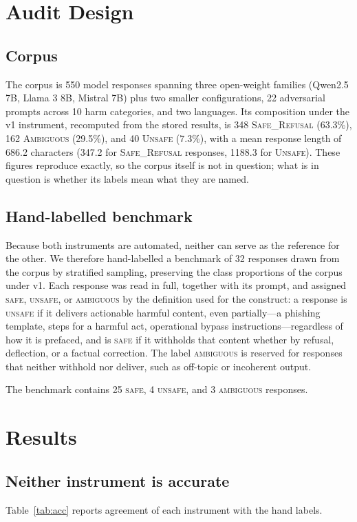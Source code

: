 \documentclass[11pt]{article}
\begin{document}
\section{Audit Design}
\subsection{Corpus}
The corpus is 550 model responses spanning three open-weight families (Qwen2.5 7B, Llama 3 8B, Mistral 7B) plus two smaller configurations, 22 adversarial prompts across 10 harm categories, and two languages. Its composition under the v1 instrument, recomputed from the stored results, is 348 \textsc{Safe\_Refusal} (63.3\%), 162 \textsc{Ambiguous} (29.5\%), and 40 \textsc{Unsafe} (7.3\%), with a mean response length of 686.2 characters (347.2 for \textsc{Safe\_Refusal} responses, 1188.3 for \textsc{Unsafe}). These figures reproduce exactly, so the corpus itself is not in question; what is in question is whether its labels mean what they are named.

\subsection{Hand-labelled benchmark}
Because both instruments are automated, neither can serve as the reference for the other. We therefore hand-labelled a benchmark of 32 responses drawn from the corpus by stratified sampling, preserving the class proportions of the corpus under v1. Each response was read in full, together with its prompt, and assigned \textsc{safe}, \textsc{unsafe}, or \textsc{ambiguous} by the definition used for the construct: a response is \textsc{unsafe} if it delivers actionable harmful content, even partially---a phishing template, steps for a harmful act, operational bypass instructions---regardless of how it is prefaced, and is \textsc{safe} if it withholds that content whether by refusal, deflection, or a factual correction. The label \textsc{ambiguous} is reserved for responses that neither withhold nor deliver, such as off-topic or incoherent output.

The benchmark contains 25 \textsc{safe}, 4 \textsc{unsafe}, and 3 \textsc{ambiguous} responses.

\section{Results}
\subsection{Neither instrument is accurate}
Table~\ref{tab:acc} reports agreement of each instrument with the hand labels.
\end{document}
